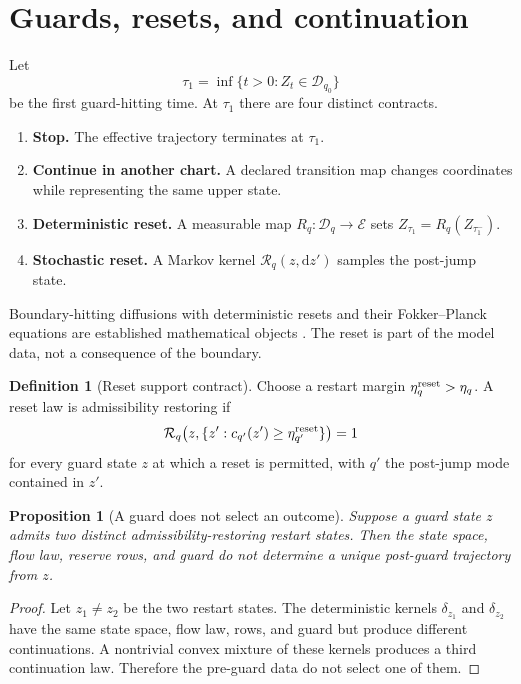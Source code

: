 \documentclass[11pt]{article}
\newtheorem{proposition}[theorem]{Proposition}
\theoremstyle{definition}
\newtheorem{definition}[theorem]{Definition}
\theoremstyle{remark}
\newcommand{\cD}{\mathcal D}
\newcommand{\cE}{\mathcal E}
\newcommand{\cR}{\mathcal R}
\newcommand{\dd}{\mathrm d}
\begin{document}
\section{Guards, resets, and continuation}
\label{sec:jump}

Let
\[
 \tau_1=\inf\{t>0:Z_t\in\cD_{q_0}\}
\]
be the first guard-hitting time.  At $\tau_1$ there are four distinct
contracts.

\begin{enumerate}[leftmargin=2em]
\item \textbf{Stop.}  The effective trajectory terminates at $\tau_1$.
\item \textbf{Continue in another chart.}  A declared transition map
      changes coordinates while representing the same upper state.
\item \textbf{Deterministic reset.}  A measurable map
      $R_q:\cD_q\to\cE$ sets $Z_{\tau_1}=R_q(Z_{\tau_1^-})$.
\item \textbf{Stochastic reset.}  A Markov kernel
      $\cR_q(z,\dd z')$ samples the post-jump state.
\end{enumerate}

Boundary-hitting diffusions with deterministic resets and their
Fokker--Planck equations are established mathematical objects
\cite{BectBailiFleury2005}.  The reset is part of the model data, not a
consequence of the boundary.

\begin{definition}[Reset support contract]
\label{def:reset-support}
Choose a restart margin $\eta_q^{\rm reset}>\eta_q$.  A reset law is
admissibility restoring if
\[
 \cR_q\bigl(z,\{z':c_{q'}(z')\ge
 \eta_{q'}^{\rm reset}\}\bigr)=1
\]
for every guard state $z$ at which a reset is permitted, with $q'$ the
post-jump mode contained in $z'$.
\end{definition}

\begin{proposition}[A guard does not select an outcome]
\label{prop:no-selection}
Suppose a guard state $z$ admits two distinct admissibility-restoring
restart states.  Then the state space, flow law, reserve rows, and guard do
not determine a unique post-guard trajectory from $z$.
\end{proposition}

\begin{proof}
Let $z_1\ne z_2$ be the two restart states.  The deterministic kernels
$\delta_{z_1}$ and $\delta_{z_2}$ have the same state space, flow law,
rows, and guard but produce different continuations.  A nontrivial convex
mixture of these kernels produces a third continuation law.  Therefore the
pre-guard data do not select one of them.
\end{proof}
\end{document}
